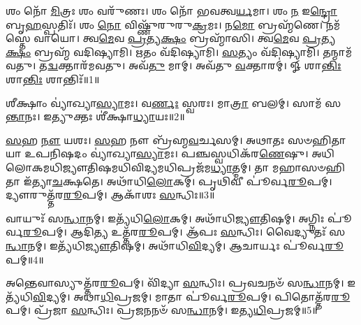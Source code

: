 \setcounter{anuvakam}{0}

𑌶𑌂 𑌨𑍋᳴ \ul{𑌮𑌿}\-𑌤𑍍𑌰𑌃 𑌶𑌂 𑌵𑌰𑍁᳴𑌣𑌃। 
𑌶𑌂 𑌨𑍋᳴ 𑌭𑌵𑌤𑍍𑌵\-\ul{𑌰𑍍𑌯}\-𑌮𑌾। 
𑌶𑌂 \ul{𑌨} 𑌇\-\ul{𑌨𑍍𑌦𑍍𑌰𑍋} 𑌬𑍃\-\ul{𑌹}\-𑌸𑍍𑌪𑌤𑌿𑌃᳴। 
𑌶𑌂 \ul{𑌨𑍋} 𑌵𑌿𑌷𑍍𑌣𑍁᳴𑌰𑍁𑌰𑍁\-\ul{𑌕𑍍𑌰}\-𑌮𑌃। 
𑌨\-\ul{𑌮𑍋} 𑌬𑍍𑌰𑌹𑍍𑌮᳴𑌣𑍇। 
𑌨𑌮᳴𑌸𑍍𑌤𑍇 𑌵𑌾𑌯𑍋। 
𑌤𑍍𑌵\-\ul{𑌮𑍇}\-𑌵 \ul{𑌪𑍍𑌰}\-𑌤𑍍𑌯\-\ul{𑌕𑍍𑌷𑌂} 𑌬𑍍𑌰𑌹𑍍𑌮𑌾᳴𑌸𑌿। 
𑌤𑍍𑌵\-\ul{𑌮𑍇}\-𑌵 \ul{𑌪𑍍𑌰}\-𑌤𑍍𑌯\-\ul{𑌕𑍍𑌷𑌂} 𑌬𑍍𑌰𑌹𑍍𑌮᳴ 𑌵𑌦𑌿𑌷𑍍𑌯𑌾𑌮𑌿। 
\-\ul{𑌋}\-𑌤𑌂 𑌵᳴𑌦𑌿𑌷𑍍𑌯𑌾𑌮𑌿। 
\-\ul{𑌸}\-𑌤𑍍𑌯𑌂 𑌵᳴𑌦𑌿𑌷𑍍𑌯𑌾𑌮𑌿। 
𑌤𑌨𑍍𑌮𑌾𑌮᳴𑌵𑌤𑍁। 
𑌤\-\ul{𑌦𑍍𑌵}\-𑌕𑍍𑌤𑌾𑌰᳴𑌮𑌵𑌤𑍁। 
𑌅𑌵᳴\-\ul{𑌤𑍁} 𑌮𑌾𑌮𑍍। 
𑌅𑌵᳴𑌤𑍁 \ul{𑌵}\-𑌕𑍍𑌤𑌾𑌰𑌮𑍍॑। 
𑍐 𑌶𑌾\-\ul{𑌨𑍍𑌤𑌿𑌃} 𑌶𑌾\-\ul{𑌨𑍍𑌤𑌿𑌃} 𑌶𑌾𑌨𑍍𑌤𑌿𑌃᳴॥1॥%
\anuvakamend[\-\ul{𑌸}\-𑌤𑍍𑌯𑌂 𑌵᳴𑌦𑌿𑌷𑍍𑌯𑌾\-\ul{𑌮𑌿} 𑌪𑌞𑍍𑌚᳴ 𑌚]

𑌶𑍀𑌕𑍍𑌷𑌾𑌂 𑌵𑍍𑌯𑌾॑𑌖𑍍𑌯𑌾\-\ul{𑌸𑍍𑌯𑌾}\-𑌮𑌃। 
𑌵\-\ul{𑌰𑍍𑌣𑌃} 𑌸𑍍𑌵𑌰𑌃। 
𑌮𑌾\-\ul{𑌤𑍍𑌰𑌾} 𑌬𑌲𑌮𑍍। 
𑌸𑌾𑌮᳴ 𑌸\-\ul{𑌨𑍍𑌤𑌾}\-𑌨𑌃। 
𑌇𑌤𑍍𑌯𑍁𑌕𑍍𑌤𑌃 𑌶𑍀॑𑌕𑍍𑌷𑌾\-\ul{𑌧𑍍𑌯𑌾}\-𑌯𑌃॥2॥
\anuvakamend[𑌶𑍀𑌕𑍍𑌷𑌾𑌂 𑌪𑌞𑍍𑌚᳴]

\-\ul{𑌸}\-𑌹 \ul{𑌨𑍗} 𑌯𑌶𑌃। 
\-\ul{𑌸}\-𑌹 𑌨𑍗 𑌬𑍍𑌰᳴𑌹𑍍𑌮\-\ul{𑌵}\-𑌰𑍍𑌚𑌸𑌮𑍍। 
𑌅𑌥𑌾𑌤𑌃 𑌸𑍞𑌹𑌿𑌤𑌾𑌯𑌾 𑌉𑌪𑌨𑌿𑌷𑌦𑌂 𑌵𑍍𑌯𑌾॑𑌖𑍍𑌯𑌾\-\ul{𑌸𑍍𑌯𑌾}\-𑌮𑌃। 
𑌪𑌞𑍍𑌚𑌸𑍍𑌵𑌧𑌿𑌕᳴𑌰\-\ul{𑌣𑍇}\-𑌷𑍁। 
𑌅𑌧𑌿𑌲𑍋𑌕𑌮𑌧𑌿\-𑌜𑍍𑌯𑍗𑌤𑌿𑌷𑌮𑌧𑌿\-𑌵𑌿𑌦𑍍𑌯𑌮𑌧𑌿\-𑌪𑍍𑌰𑌜᳴𑌮\-\ul{𑌧𑍍𑌯𑌾}\-𑌤𑍍𑌮𑌮𑍍। 
𑌤𑌾 𑌮𑌹𑌾\-𑌸𑍞𑌹𑌿𑌤𑌾 𑌇᳴𑌤𑍍𑌯𑌾\-\ul{𑌚}\-𑌕𑍍𑌷𑌤𑍇। 
𑌅𑌥𑌾᳴𑌧𑌿\-\ul{𑌲𑍋}\-𑌕𑌮𑍍। 
𑌪𑍃𑌥𑌿𑌵𑍀 𑌪𑍂॑𑌰𑍍𑌵\-\-\ul{𑌰𑍂}\-𑌪𑌮𑍍। 
𑌦𑍍𑌯𑍗𑌰𑍁𑌤𑍍𑌤᳴𑌰\-\-\ul{𑌰𑍂}\-𑌪𑌮𑍍। 
𑌆𑌕𑌾᳴𑌶𑌃 \ul{𑌸}\-𑌨𑍍𑌧𑌿𑌃॥3॥

𑌵𑌾𑌯𑍁𑌃᳴ 𑌸\-\ul{𑌨𑍍𑌧𑌾}\-𑌨𑌮𑍍। 
𑌇𑌤𑍍𑌯᳴𑌧𑌿\-\-\ul{𑌲𑍋}\-𑌕𑌮𑍍। 
𑌅𑌥𑌾᳴𑌧𑌿\-\ul{𑌜𑍍𑌯𑍗}\-𑌤𑌿𑌷𑌮𑍍। 
𑌅𑌗𑍍𑌨𑌿𑌃 𑌪𑍂॑𑌰𑍍𑌵\-\-\ul{𑌰𑍂}\-𑌪𑌮𑍍। 
𑌆𑌦𑌿𑌤𑍍𑌯 𑌉𑌤𑍍𑌤᳴𑌰\-\-\ul{𑌰𑍂}\-𑌪𑌮𑍍। 
𑌆᳴𑌪𑌃 \ul{𑌸}\-𑌨𑍍𑌧𑌿𑌃। 
𑌵𑍈𑌦𑍍𑌯𑍁𑌤𑌃᳴ 𑌸\-\ul{𑌨𑍍𑌧𑌾}\-𑌨𑌮𑍍। 
𑌇𑌤𑍍𑌯᳴𑌧𑌿\-\-\ul{𑌜𑍍𑌯𑍗}\-𑌤𑌿𑌷𑌮𑍍। 
𑌅𑌥𑌾᳴𑌧𑌿\-\ul{𑌵𑌿}\-𑌦𑍍𑌯𑌮𑍍। 
𑌆𑌚𑌾𑌰𑍍𑌯𑌃 𑌪𑍂॑𑌰𑍍𑌵\-\ul{𑌰𑍂}\-𑌪𑌮𑍍॥4॥

𑌅𑌨𑍍𑌤𑍇𑌵𑌾𑌸𑍍𑌯𑍁𑌤𑍍𑌤᳴𑌰\-\-\ul{𑌰𑍂}\-𑌪𑌮𑍍। 
𑌵𑌿᳴𑌦𑍍𑌯𑌾 \ul{𑌸}\-𑌨𑍍𑌧𑌿𑌃। 
𑌪𑍍𑌰𑌵𑌚𑌨𑍞᳴ 𑌸\-\ul{𑌨𑍍𑌧𑌾}\-𑌨𑌮𑍍। 
𑌇𑌤𑍍𑌯᳴𑌧𑌿\-\-\ul{𑌵𑌿}\-𑌦𑍍𑌯𑌮𑍍। 
𑌅𑌥𑌾\-\ul{𑌧𑌿}\-𑌪𑍍𑌰𑌜𑌮𑍍। 
𑌮𑌾𑌤𑌾 𑌪𑍂॑𑌰𑍍𑌵\-\-\ul{𑌰𑍂}\-𑌪𑌮𑍍। 
𑌪𑌿𑌤𑍋𑌤𑍍𑌤᳴𑌰\-\-\ul{𑌰𑍂}\-𑌪𑌮𑍍। 
𑌪𑍍𑌰᳴𑌜𑌾 \ul{𑌸}\-𑌨𑍍𑌧𑌿𑌃। 
𑌪𑍍𑌰𑌜𑌨𑌨𑍞᳴ 𑌸\-\ul{𑌨𑍍𑌧𑌾}\-𑌨𑌮𑍍। 
𑌇𑌤𑍍𑌯\-\ul{𑌧𑌿}\-𑌪𑍍𑌰𑌜𑌮𑍍॥5॥

